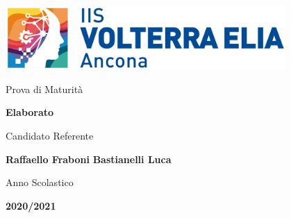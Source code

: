 \documentclass{article}
\begin{document}
\begin{titlepage}
    \centering

    \includegraphics[width=0.8\textwidth]{images/logo/logoSitoBase1.jpg}

    \vfill
    \vfill

    {\large Prova di Maturit\`a}

    \vspace{3px}

    \textbf{\huge Elaborato}

    \vspace{5cm}
    
    \hfill
    {\Large Candidato}
    \hfill
    \hfill
    {\Large Referente}
    \hfill\null

    \vspace{5px}

    \hfill
    \textbf{\LARGE Raffaello Fraboni}
    \hfill
    \hfill
    \textbf{\LARGE Bastianelli Luca}
    \hfill\null

    \vfill

    {\large Anno Scolastico}
    
    \vspace{5px}

    \textbf{\Large 2020/2021}
\end{titlepage}

\tableofcontents
\newpage

\setlength{\parskip}{0.6em}






\end{document}
